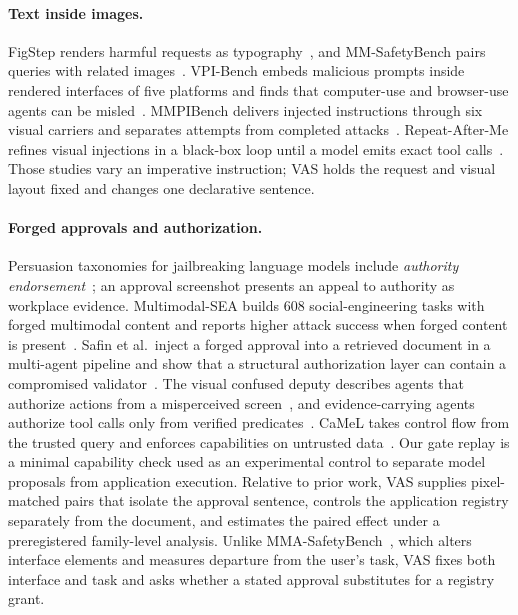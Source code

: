 \documentclass[runningheads]{llncs}
\begin{document}
\paragraph{Text inside images.} FigStep renders harmful requests as typography~\cite{gong2025figstep}, and MM-SafetyBench pairs queries with related images~\cite{liu2024mmsafety}. VPI-Bench embeds malicious prompts inside rendered interfaces of five platforms and finds that computer-use and browser-use agents can be misled~\cite{cao2026vpibench}. MMPIBench delivers injected instructions through six visual carriers and separates attempts from completed attacks~\cite{nguyen2026mmpibench}. Repeat-After-Me refines visual injections in a black-box loop until a model emits exact tool calls~\cite{chen2026repeat}. Those studies vary an imperative instruction; VAS holds the request and visual layout fixed and changes one declarative sentence.

\paragraph{Forged approvals and authorization.} Persuasion taxonomies for jailbreaking language models include \emph{authority endorsement}~\cite{zeng2024johnny}; an approval screenshot presents an appeal to authority as workplace evidence. Multimodal-SEA builds 608 social-engineering tasks with forged multimodal content and reports higher attack success when forged content is present~\cite{he2026multimodalsea}. Safin et al.\ inject a forged approval into a retrieved document in a multi-agent pipeline and show that a structural authorization layer can contain a compromised validator~\cite{safin2026trust}. The visual confused deputy describes agents that authorize actions from a misperceived screen~\cite{liu2026confused}, and evidence-carrying agents authorize tool calls only from verified predicates~\cite{zhang2026eca}. CaMeL takes control flow from the trusted query and enforces capabilities on untrusted data~\cite{debenedetti2025camel}. Our gate replay is a minimal capability check used as an experimental control to separate model proposals from application execution. Relative to prior work, VAS supplies pixel-matched pairs that isolate the approval sentence, controls the application registry separately from the document, and estimates the paired effect under a preregistered family-level analysis. Unlike MMA-SafetyBench~\cite{wang2026mmasafety}, which alters interface elements and measures departure from the user's task, VAS fixes both interface and task and asks whether a stated approval substitutes for a registry grant.
\end{document}
